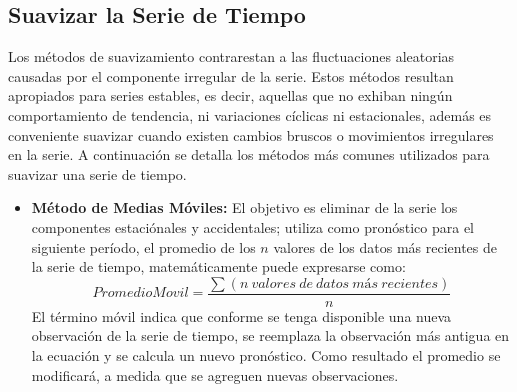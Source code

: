\subsection{Suavizar la Serie de Tiempo}
Los métodos de suavizamiento contrarestan a las fluctuaciones aleatorias causadas por el componente irregular de la serie. Estos métodos resultan apropiados para series 
estables, es decir, aquellas que no exhiban ningún comportamiento de tendencia, ni variaciones cíclicas ni estacionales, además es conveniente suavizar cuando existen 
cambios bruscos o movimientos irregulares en la serie. A continuación se detalla los métodos más comunes utilizados para suavizar una serie de tiempo.
\begin{itemize}
 \item{\textbf{Método de Medias Móviles:}} El objetivo es eliminar de la serie los componentes estaciónales y accidentales; utiliza como pronóstico para el siguiente período,
 el promedio de los $n$ valores de los datos más recientes de la serie de tiempo, matemáticamente puede expresarse como:
 \begin{equation}
  Promedio Movil=\frac{\sum (n\ valores\ de\ datos\ más\ recientes)}{n} 
 \end{equation}
  El término móvil indica que conforme se tenga disponible una nueva observación de la serie de tiempo, se reemplaza la observación más antigua en la ecuación y se calcula un
  nuevo pronóstico. Como resultado el promedio se modificará, a medida que se agreguen nuevas observaciones.


\end{itemize}
